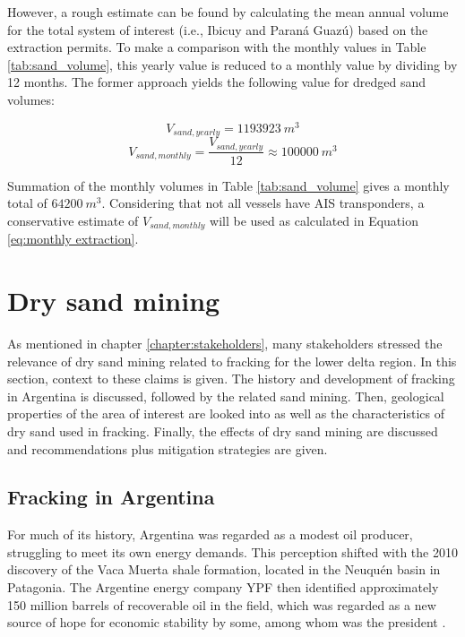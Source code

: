 However, a rough estimate can be found by calculating the mean annual volume for the total system of interest (i.e., Ibicuy and Paraná Guazú) based on the extraction permits. To make a comparison with the monthly values in Table \ref{tab:sand_volume}, this yearly value is reduced to a monthly value by dividing by 12 months. The former approach yields the following value for dredged sand volumes:

\begin{equation}
    V_{sand,yearly} = 1193923 ~m^3
\end{equation}
\begin{equation}
\label{eq:monthly extraction}
    V_{sand,monthly} = \frac{V_{sand,yearly}}{12} \approx 100000 ~m^3
\end{equation}

Summation of the monthly volumes in Table \ref{tab:sand_volume} gives a monthly total of $64200 ~m^3$. Considering that not all vessels have AIS transponders, a conservative estimate of $V_{sand,monthly}$ will be used as calculated in Equation \ref{eq:monthly extraction}.

\section{Dry sand mining}
As mentioned in chapter \ref{chapter:stakeholders}, many stakeholders stressed the relevance of dry sand mining related to fracking for the lower delta region. In this section, context to these claims is given. The history and development of fracking in Argentina is discussed, followed by the related sand mining. Then, geological properties of the area of interest are looked into as well as the characteristics of dry sand used in fracking. Finally, the effects of dry sand mining are discussed and recommendations plus mitigation strategies are given.

\subsection{Fracking in Argentina}
\label{sec: fracking in argentina}
For much of its history, Argentina was regarded as a modest oil producer, struggling to meet its own energy demands. This perception shifted with the 2010 discovery of the Vaca Muerta shale formation, located in the Neuquén basin in Patagonia. The Argentine energy company YPF then identified approximately 150 million barrels of recoverable oil in the field, which was regarded as a new source of hope for economic stability by some, among whom was the president \autocite{kraussArgentinaHopesBig2011}.

